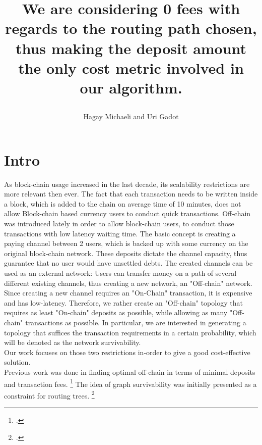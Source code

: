 \documentclass{cup-ino}
\title{\item We are considering 0 fees with regards to the routing path chosen, thus making the deposit amount the only cost metric involved in our algorithm.}
\author{Hagay Michaeli and Uri Gadot}
\begin{document}
\maketitle


\section{Intro}
As block-chain usage increased in the last decade, its scalability restrictions are more relevant then ever. The fact that each transaction needs to be written inside a block, which is added to the chain on average time of 10 minutes, does not allow Block-chain based currency users to conduct quick transactions. Off-chain was introduced lately in order to allow block-chain users, to conduct those transactions with low latency waiting time.
The basic concept is creating a paying channel between 2 users, which is backed up with some currency on the original block-chain network. These deposits dictate the channel capacity, thus guarantee that no user would have unsettled debts.
The created channels can be used as an external network:
Users can transfer money on a path of several different existing channels, thus creating a new network, an "Off-chain" network.\\
Since creating a new channel requires an "On-Chain" transaction, it is expensive and has low-latency. Therefore, we rather create an "Off-chain" topology that requires as least "On-chain" deposits as possible, while allowing as many "Off-chain" transactions as possible. In particular, we are interested in generating a topology that suffices the transaction requirements in a certain probability, which will be denoted as the network survivability.  \\
Our work focuses on those two restrictions in-order to give a good cost-effective solution.\\
Previous work was done in finding optimal off-chain in terms of minimal deposits and transaction fees. \footcite{9352899}
The idea of graph survivability was initially presented as a constraint for routing trees. \footcite{7163640}
\end{document}
